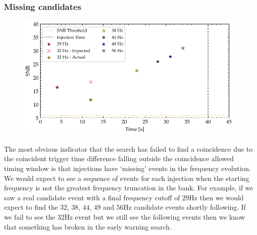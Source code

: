 \subsubsection{\label{6:sec:missing-cands}Missing candidates}
%
\begin{figure}
       \centering
    \includegraphics[width=\textwidth]{images/6_earlywarning/identified-problems/non_mono_snr.pdf}
    \caption{}
    \label{6:fig:non-monotonic-snr}
\end{figure}
%

The most obvious indicator that the search has failed to find a coincidence due to the coincident trigger time difference falling outside the coincidence allowed timing window is that injections have `missing' events in the frequency evolution. We would expect to see a sequence of events for each injection when the starting frequency is not the greatest frequency truncation in the bank. For example, if we saw a real candidate event with a final frequency cutoff of $29$Hz then we would expect to find the $32$, $38$, $44$, $49$ and $56$Hz candidate events shortly following. If we fail to see the $32$Hz event but we still see the following events then we know that something has broken in the early warning search.

